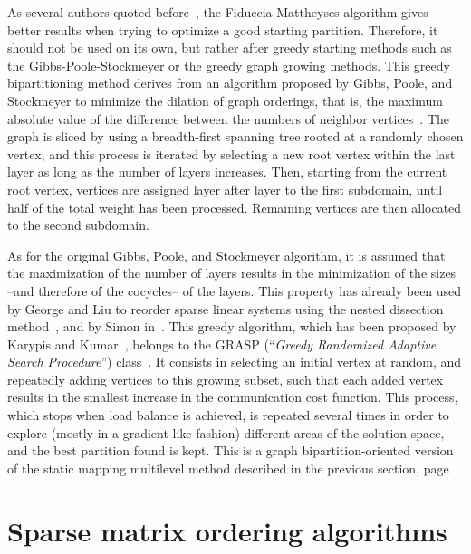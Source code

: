 \begin{itemize}
As several authors quoted before~\cite{hele93c,kaku95b},
the Fiduccia-Mattheyses algorithm gives better results when trying to optimize
a good starting partition. Therefore, it should not be used on its own, but
rather after greedy starting methods such as the Gibbs-Poole-Stockmeyer or
the greedy graph growing methods.
This greedy bipartitioning method derives from an algorithm proposed by
Gibbs, Poole, and Stockmeyer to minimize the dilation of graph orderings,
that is, the maximum absolute value of the difference between the numbers of
neighbor vertices~\cite{gipost76}.
The graph is sliced by using a breadth-first spanning tree rooted
at a randomly chosen vertex, and this process is iterated by selecting a new
root vertex within the last layer as long as the number of layers increases.
Then, starting from the current root vertex, vertices are assigned layer after
layer to the first subdomain, until half of the total weight has been
processed. Remaining vertices are then allocated to the second subdomain.

As for the original Gibbs, Poole, and Stockmeyer algorithm, it is assumed that
the maximization of the number of layers results in the minimization of the
sizes --and therefore of the cocycles-- of the layers.
This property has already been used by George and Liu to reorder sparse
linear systems using the nested dissection method~\cite{geli81}, and by
Simon in~\cite{simo91}.
\label{sec-algo-ggge}
This greedy algorithm, which has been proposed by Karypis and
Kumar~\cite{kaku95a}, belongs to the GRASP (``\textit{Greedy
Randomized Adaptive Search Procedure\/}'') class~\cite{lafeel94}.
It consists in selecting an initial vertex at random, and repeatedly adding
vertices to this growing subset, such that each added vertex results in the
smallest increase in the communication cost function.
This process, which stops when load balance is achieved, is repeated
several times in order to explore (mostly in a gradient-like fashion)
different areas of the solution space, and the best partition found is kept.
This is a graph bipartition-oriented version of the static mapping
multilevel method described in the previous section,
page~\pageref{sec-algo-mle}.
\end{itemize}

\section{Sparse matrix ordering algorithms}
\label{sec-algo-order}

